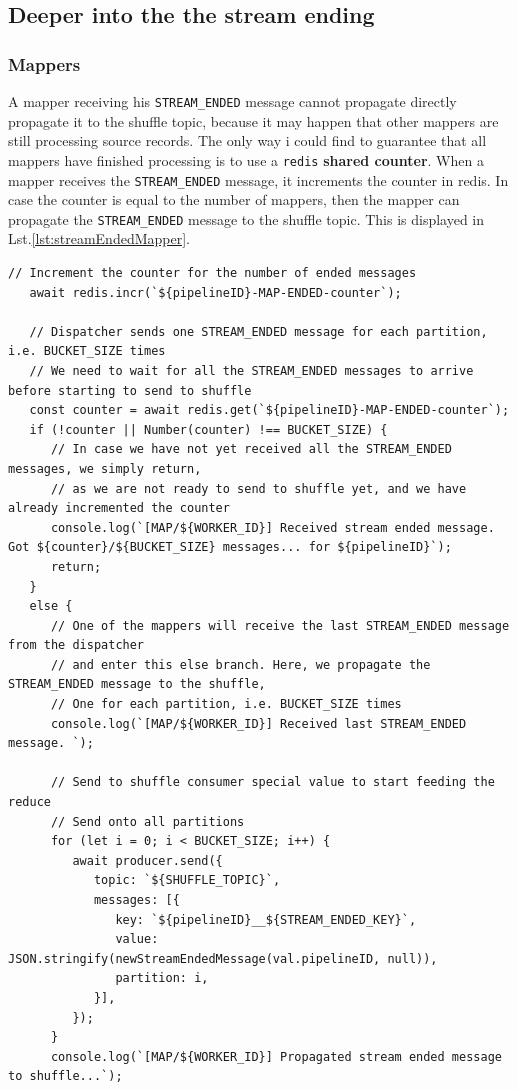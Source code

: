 \subsection{Deeper into the the stream ending}

\subsubsection{Mappers}
A mapper receiving his \lstinline|STREAM_ENDED| message cannot propagate directly propagate it to the shuffle topic, because it may happen that other mappers are still processing source records.
The only way i could find to guarantee that all mappers have finished processing is to use a \texttt{redis} \textbf{shared counter}.
When a mapper receives the \lstinline|STREAM_ENDED| message, it increments the counter in redis.
In case the counter is equal to the number of mappers, then the mapper can propagate the \lstinline|STREAM_ENDED| message to the shuffle topic.
This is displayed in Lst.\ref{lst:streamEndedMapper}.


\begin{lstlisting}[label={lst:streamEndedMapper}, caption={Handling the STREAM\_ENDED message in a mapper},captionpos={top}]
   // Increment the counter for the number of ended messages
   await redis.incr(`${pipelineID}-MAP-ENDED-counter`);
   
   // Dispatcher sends one STREAM_ENDED message for each partition, i.e. BUCKET_SIZE times
   // We need to wait for all the STREAM_ENDED messages to arrive before starting to send to shuffle
   const counter = await redis.get(`${pipelineID}-MAP-ENDED-counter`);
   if (!counter || Number(counter) !== BUCKET_SIZE) {
      // In case we have not yet received all the STREAM_ENDED messages, we simply return,
      // as we are not ready to send to shuffle yet, and we have already incremented the counter
      console.log(`[MAP/${WORKER_ID}] Received stream ended message. Got ${counter}/${BUCKET_SIZE} messages... for ${pipelineID}`);
      return;
   }
   else {
      // One of the mappers will receive the last STREAM_ENDED message from the dispatcher
      // and enter this else branch. Here, we propagate the STREAM_ENDED message to the shuffle,
      // One for each partition, i.e. BUCKET_SIZE times
      console.log(`[MAP/${WORKER_ID}] Received last STREAM_ENDED message. `);
   
      // Send to shuffle consumer special value to start feeding the reduce
      // Send onto all partitions
      for (let i = 0; i < BUCKET_SIZE; i++) {
         await producer.send({
            topic: `${SHUFFLE_TOPIC}`,
            messages: [{
               key: `${pipelineID}__${STREAM_ENDED_KEY}`,
               value: JSON.stringify(newStreamEndedMessage(val.pipelineID, null)),
               partition: i,
            }],
         });
      }
      console.log(`[MAP/${WORKER_ID}] Propagated stream ended message to shuffle...`);
\end{lstlisting}


